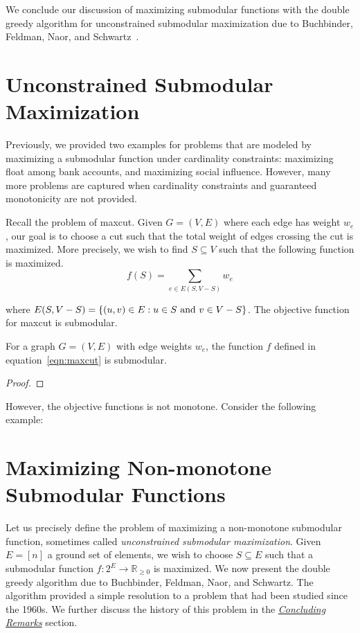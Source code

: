 \documentclass{article}
\begin{document}

We conclude our discussion of maximizing submodular functions with the double greedy algorithm for unconstrained submodular maximization due to Buchbinder, Feldman, Naor, and Schwartz~\cite{BFSS15}.

\section{Unconstrained Submodular Maximization}

Previously, we provided two examples for problems that are modeled by maximizing a submodular function under cardinality constraints: maximizing float among bank accounts, and maximizing social influence. However, many more problems are captured when cardinality constraints and guaranteed monotonicity are not provided.

Recall the problem of maxcut. Given $G = (V, E)$ where each edge has weight $w_e$, our goal is to choose a cut such that the total weight of edges crossing the cut is maximized. More precisely, we wish to find $S \subseteq V$ such that the following function is maximized.
\begin{equation}\label{eqn:maxcut}
f(S) = \sum_{e \in E(S, V - S)} w_e
\end{equation}

where $E(S, V - S) = \{ (u, v) \in E: u \in S \textup{ and } v \in V - S \}$. The objective function for maxcut is submodular.
\begin{claim}
For a graph $G = (V, E)$ with edge weights $w_e$, the function $f$ defined in equation~\ref{eqn:maxcut} is submodular.
\end{claim}
\begin{proof}

\end{proof}

However, the objective functions is not monotone. Consider the following example:

\section{Maximizing Non-monotone Submodular Functions}

Let us precisely define the problem of maximizing a non-monotone submodular function, sometimes called \emph{unconstrained submodular maximization}. Given $E = [n]$ a ground set of elements, we wish to choose $S \subseteq E$ such that a submodular function $f: 2^E \rightarrow \mathbb{R}_{\geq 0}$ is maximized. We now present the double greedy algorithm due to Buchbinder, Feldman, Naor, and Schwartz. The algorithm provided a simple resolution to a problem that had been studied since the 1960s. We further discuss the history of this problem in the \hyperref[sec:conclusion]{\emph{Concluding Remarks}} section.
\end{document}
